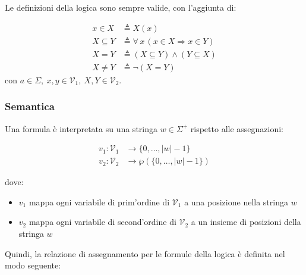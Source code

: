 \documentclass[italian, 10pt]{article}
\begin{document}
\bigskip
Le definizioni della logica \MFO sono sempre valide, con l'aggiunta di:

\begin{align*}
  x \in X       & \triangleq X(x)                                          \\
  X \subseteq Y & \triangleq \forall \, x \, (x \in X \Rightarrow x \in Y) \\
  X = Y         & \triangleq (X \subseteq Y) \land (Y \subseteq X)         \\
  X \neq Y      & \triangleq \lnot (X = Y)
\end{align*}
con \(a \in \Sigma, \ x, y \in \mathcal{V}_1, \ X, Y \in \mathcal{V}_2\).

\subsubsection{Semantica}

Una formula \MSO è interpretata su una stringa \(w \in \Sigma^+\) rispetto alle assegnazioni:

\begin{align*}
  v_1 : \mathcal{V}_1 & \rightarrow \{0, \ldots, |w| - 1 \}      \\
  v_2 : \mathcal{V}_2 & \rightarrow \wp(\{0, \ldots, |w| - 1 \})
\end{align*}

dove:
\begin{itemize}
  \item \(v_1\) mappa ogni variabile di prim'ordine di \(\mathcal{V}_1\) a una posizione nella stringa \(w\)
  \item \(v_2\) mappa ogni variabile di second'ordine di \(\mathcal{V}_2\) a un insieme di posizioni della stringa \(w\)
\end{itemize}

Quindi, la relazione di assegnamento per le formule della logica \MSO è definita nel modo seguente:
\end{document}
